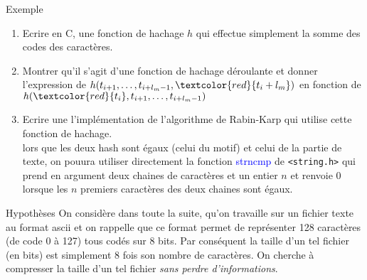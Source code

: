 \documentclass[10pt]{beamer}
\begin{document}
\begin{frame}{\Ctitle}{\stitle}
	\begin{exampleblock}{Exemple}
		\begin{enumerate}
			\item Ecrire en C, une fonction de hachage $h$ qui effectue simplement la somme des codes des caractères.
			\item Montrer qu'il s'agit d'une fonction de hachage déroulante et donner l'expression de $h(t_{i+1},\dots,t_{i+l_m-1},\textcolor{red}{t_i+l_m})$ en fonction de $h(\textcolor{red}{t_i},t_{i+1},\dots,t_{i+l_m-1})$
			\item Ecrire une l'implémentation de l'algorithme de Rabin-Karp qui utilise cette fonction de hachage. \\
			      \textcolor{OliveGreen}{\small \aide \;} lors que les deux hash sont égaux (celui du motif) et celui de la partie de texte, on pouura utiliser directement la fonction \textcolor{blue}{strncmp} de {\tt <string.h>} qui prend en argument deux chaines de caractères et un entier $n$ et renvoie 0 lorsque les $n$ premiers caractères des deux chaines sont égaux.
		\end{enumerate}
	\end{exampleblock}
\end{frame}

\begin{frame}{\Ctitle}{\stitle}
	\begin{block}{Hypothèses}
		{\small On considère dans toute la suite, qu'on travaille sur un fichier texte au format {\sc ascii} et on rappelle que ce format permet de représenter 128 caractères (de code 0 à 127) tous codés sur 8 bits. Par conséquent la taille d'un tel fichier (en bits) est simplement 8 fois son nombre de caractères.
			On cherche à compresser la taille d'un tel fichier \textit{sans perdre d'informations}.}
	\end{block}
\end{frame}
\end{document}
